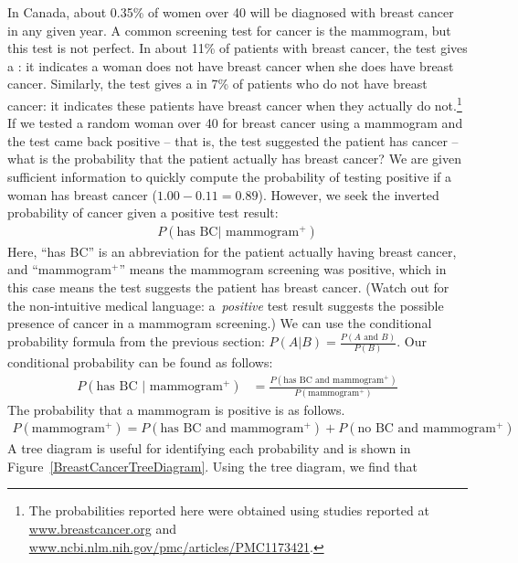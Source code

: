 \begin{example}{In Canada, about 0.35\% of women over 40 will be diagnosed with breast cancer in any given year. A common screening test for cancer is the mammogram, but this test is not perfect. In about 11\% of patients with breast cancer, the test gives a : it indicates a woman does not have breast cancer when she does have breast cancer. Similarly, the test gives a  in 7\% of patients who do not have breast cancer: it indicates these patients have breast cancer when they actually do not.\footnote{The probabilities reported here were obtained using studies reported at \href{http://www.breastcancer.org/symptoms/testing/new_research/20090831b.jsp}{www.breastcancer.org} and \href{http://www.ncbi.nlm.nih.gov/pmc/articles/PMC1173421/}{www.ncbi.nlm.nih.gov/pmc/articles/PMC1173421}.} If we tested a random woman over 40 for breast cancer using a mammogram and the test came back positive -- that is, the test suggested the patient has cancer -- what is the probability that the patient actually has breast cancer?}\label{probabilityOfBreastCancerGivenPositiveTestExample}
We are given sufficient information to quickly compute the probability of testing positive if a woman has breast cancer ($1.00 - 0.11 = 0.89$). However, we seek the inverted probability of cancer given a positive test result:
\begin{align*}
P(\text{has BC} | \text{ mammogram$^+$})
\end{align*}
Here, ``has BC'' is an abbreviation for the patient actually having breast cancer, and ``mammogram$^+$'' means the mammogram screening was positive, which in this case means the test suggests the patient has breast cancer. (Watch out for the non-intuitive medical language: a~\emph{positive} test result suggests the possible presence of cancer in a mammogram screening.) We can use the conditional probability formula from the previous section: $P(A|B) = \frac{P(A \text{ and } B)}{P(B)}$. Our conditional probability can be found as follows:
\begin{align*}
P(\text{has BC $|$ mammogram$^+$}) &=  \frac{P(\text{has BC and mammogram$^+$})}{P(\text{mammogram$^+$})}
\end{align*}
The probability that a mammogram is positive is as follows.
\begin{align*}
P(\text{mammogram$^+$})=P(\text{has BC and mammogram$^+$}) +  P(\text{no BC and mammogram$^+$})
\end{align*}
A tree diagram is useful for identifying each probability and is shown in Figure~\ref{BreastCancerTreeDiagram}. Using the tree diagram, we find that

\end{example}

